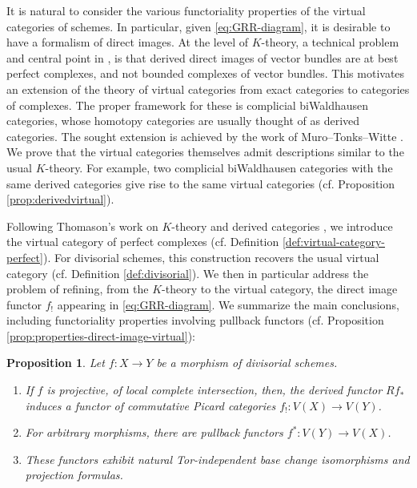 \documentclass[11pt]{article}
\newcommand{\cf}{cf.\xspace}
\theoremstyle{plain}
\newtheorem{prop}[thm]{Proposition}
\theoremstyle{definition}
\begin{document}
It is natural to consider the various functoriality properties of the virtual categories of schemes. In particular, given \eqref{eq:GRR-diagram}, it is desirable to have a formalism of direct images. At the level of $K$-theory, a technical problem and central point in \cite{SGA6}, is that derived direct images of vector bundles are at best perfect complexes, and not bounded complexes of vector bundles. This motivates an extension of the theory of virtual categories from exact categories to categories of complexes. The proper framework for these is complicial biWaldhausen categories, whose homotopy categories are usually thought of as derived categories. The sought extension is achieved by the work of Muro--Tonks--Witte \cite{Muro:determinant}. We prove that the virtual categories themselves admit descriptions similar to the usual $K$-theory. For example, two complicial biWaldhausen categories with the same derived categories give rise to the same virtual categories (\cf Proposition \ref{prop:derivedvirtual}).

Following Thomason's work on $K$-theory and derived categories \cite{ThomasonTrobaugh}, we introduce the virtual category of perfect complexes (\cf Definition \ref{def:virtual-category-perfect}). For divisorial schemes, this construction recovers the usual virtual category (\cf Definition \ref{def:divisorial}). We then in particular address the problem of refining, from the $K$-theory to the virtual category, the direct image functor $f_{!}$ appearing in \eqref{eq:GRR-diagram}. We summarize the main conclusions, including functoriality properties involving pullback functors (\cf Proposition \ref{prop:properties-direct-image-virtual}):
\begin{prop}\label{prop:intro-direct}
Let $f\colon X\to Y$ be a morphism of divisorial schemes.

\begin{enumerate}
\item If $f$ is projective, of local complete intersection, then, the derived functor $Rf_{\ast}$ induces a functor of commutative Picard categories $f_{!}\colon V(X)\to V(Y)$.

\item For arbitrary morphisms, there are pullback functors $f^\ast \colon V(Y) \to V(X)$.

\item These functors exhibit natural Tor-independent base change isomorphisms and projection formulas.
\end{enumerate}
\end{prop}
\end{document}
